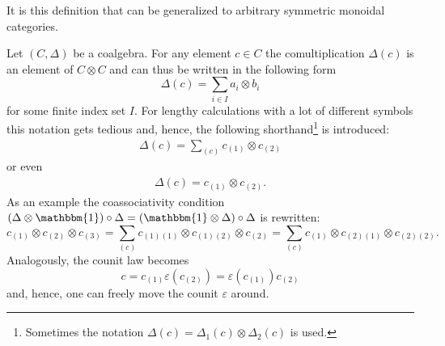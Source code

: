 
    \begin{remark}
        It is this definition that can be generalized to arbitrary symmetric monoidal categories.
    \end{remark}

    \begin{notation}
        Let $(C,\Delta)$ be a coalgebra. For any element $c\in C$ the comultiplication $\Delta(c)$ is an element of $C\otimes C$ and can thus be written in the following form \[\Delta(c) = \sum_{i\in I}a_i\otimes b_i\] for some finite index set $I$. For lengthy calculations with a lot of different symbols this notation gets tedious and, hence, the following shorthand\footnote{Sometimes the notation $\Delta(c) = \Delta_1(c)\otimes\Delta_2(c)$ is used.} is introduced:
        \begin{gather}
            \Delta(c) = \sum_{(c)}c_{(1)}\otimes c_{(2)}
        \end{gather}
        or even
        \begin{gather}
            \Delta(c) = c_{(1)}\otimes c_{(2)}.
        \end{gather}
        As an example the coassociativity condition $(\Delta\otimes\mathbbm{1})\circ\Delta = (\mathbbm{1}\otimes\Delta)\circ\Delta$ is rewritten: \[c_{(1)}\otimes c_{(2)}\otimes c_{(3)} = \sum_{(c)} c_{(1)(1)}\otimes c_{(1)(2)}\otimes c_{(2)} = \sum_{(c)} c_{(1)}\otimes c_{(2)(1)}\otimes c_{(2)(2)}.\] Analogously, the counit law becomes \[c = c_{(1)}\varepsilon(c_{(2)}) = \varepsilon(c_{(1)})c_{(2)}\] and, hence, one can freely move the counit $\varepsilon$ around.
    \end{notation}

